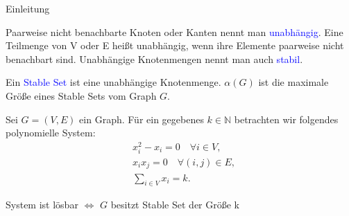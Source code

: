 \begin{mslide}{Einleitung}
\framebreak

\begin{definition}
Paarweise nicht benachbarte Knoten oder Kanten nennt man \textcolor{blue}{unabhängig}. Eine Teilmenge von V oder E heißt unabhängig, wenn ihre Elemente paarweise nicht benachbart sind. Unabhängige Knotenmengen nennt man auch \textcolor{blue}{stabil}. 
\end{definition}

\begin{definition}
Ein \textcolor{blue}{Stable Set} ist eine unabhängige Knotenmenge.  $\alpha (G)$ ist die maximale Größe eines Stable Sets vom Graph $G$.
\end{definition}

\begin{figure}[h]
\begin{center}
\end{center}
\end{figure}

\framebreak

Sei $G = (V, E)$ ein Graph. Für ein gegebenes $k \in \mathbb{N}$ betrachten wir folgendes polynomielle System:
\begin{align*}
&x_i^2 - x_i = 0 \quad \forall i \in V, \\
&x_i x_j = 0 \quad \forall (i,j) \in E, \\
& \sum_{i \in V} x_i = k.
\end{align*} 

\begin{thm}
System ist lösbar $\Leftrightarrow$ $G$ besitzt Stable Set der Größe k  
\end{thm}

\end{mslide}

